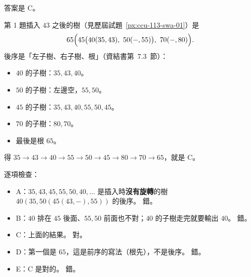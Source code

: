 \begin{pastsoln}
答案是 C。

第 1 題插入 $43$ 之後的樹（見歷屆試題~\ref{px:ccu-113-swa-01}）是
\[
65\Bigl(45\bigl(40(35, 43),\ 50(-, 55)\bigr),\ 70(-, 80)\Bigr).
\]
後序是「左子樹、右子樹、根」（資結書第~7.3~節）：
\begin{itemize}
\item $40$ 的子樹：$35, 43, 40$。
\item $50$ 的子樹：左邊空，$55, 50$。
\item $45$ 的子樹：$35, 43, 40, 55, 50, 45$。
\item $70$ 的子樹：$80, 70$。
\item 最後是根 $65$。
\end{itemize}
得 $35 \to 43 \to 40 \to 55 \to 50 \to 45 \to 80 \to 70 \to 65$，就是 C。

逐項檢查：
\begin{itemize}
\item A：$35, 43, 45, 55, 50, 40, \ldots$ 是插入時\textbf{沒有旋轉}的樹 $40(35, 50(45(43, -), 55))$ 的後序。 錯。
\item B：$40$ 排在 $45$ 後面、$55, 50$ 前面也不對；$40$ 的子樹走完就要輸出 $40$。 錯。
\item C：上面的結果。 對。
\item D：第一個是 $65$，這是前序的寫法（根先），不是後序。 錯。
\item E：C 是對的。 錯。
\end{itemize}
\end{pastsoln}
